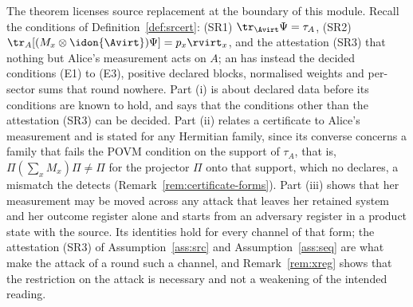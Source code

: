 
The theorem licenses source replacement at the boundary of this module.
Recall the conditions of Definition~\ref{def:srcert}: (SR1)
$\tr_{\Avirt}\Psi=\tau_A$, (SR2)
$\tr_A[(M_x\otimes\idon{\Avirt})\Psi]=p_x\rvirt_x$, and the attestation (SR3)
that nothing but Alice's measurement acts on $A$; an 
has instead the decided conditions (E1) to (E3), positive declared blocks,
normalised weights and per-sector sums that round nowhere. Part (i) is about
declared data before its conditions are known to hold, and says that the
conditions other than the attestation (SR3) can be decided. Part (ii) relates
a certificate to Alice's measurement and is stated for any Hermitian family,
since its converse concerns a family that fails the POVM condition on the
support of $\tau_A$, that is, $\Pi(\sum_xM_x)\Pi\ne\Pi$ for the projector
$\Pi$ onto that support, which no  declares, a
mismatch the  detects (Remark~\ref{rem:certificate-forms}). Part
(iii) shows that her measurement may be moved across any attack that leaves
her retained system and her outcome register alone and starts from an
adversary register in a product state with the source. Its identities hold
for every channel of that form; the attestation (SR3) of
Assumption~\ref{ass:src} and Assumption~\ref{ass:seq} are what make the
attack of a round such a channel, and Remark~\ref{rem:xreg} shows that the
restriction on the attack is necessary and not a weakening of the intended
reading.

